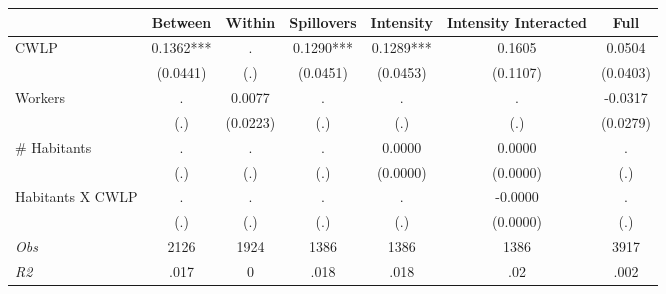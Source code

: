 \begin{tabular}{l*{6}{c}}\hline&\multicolumn{1}{c}{Between}&\multicolumn{1}{c}{Within}&\multicolumn{1}{c}{Spillovers}&\multicolumn{1}{c}{Intensity}&\multicolumn{1}{c}{Intensity Interacted}&\multicolumn{1}{c}{Full}\\ \hline 
CWLP & 0.1362*** & . & 0.1290*** & 0.1289*** & 0.1605 & 0.0504 \\
 & (0.0441) & (.) & (0.0451) & (0.0453) & (0.1107) & (0.0403) \\
Workers & . & 0.0077 & . & . & . & -0.0317 \\
 & (.) & (0.0223) & (.) & (.) & (.) & (0.0279) \\
\# Habitants & . & . & . & 0.0000 & 0.0000 & . \\
 & (.) & (.) & (.) & (0.0000) & (0.0000) & (.) \\
Habitants X CWLP & . & . & . & . & -0.0000 & . \\
 & (.) & (.) & (.) & (.) & (0.0000) & (.) \\
\hline \textit{Obs} & 2126 & 1924 & 1386 & 1386 & 1386 & 3917 \\ \textit{R2} & .017 & 0 & .018 & .018 & .02 & .002 \\ \hline \end{tabular}
